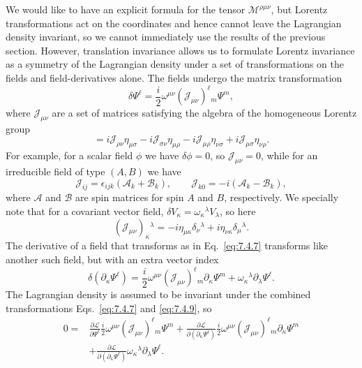 We would like to have an explicit formula for the tensor
$\mathcal{M}^{\rho\mu\nu}$, but Lorentz transformations act on the coordinates
and hence cannot leave the Lagrangian density invariant, so we cannot
immediately use the results of the previous section. However, translation
invariance allows us to formulate Lorentz invariance as a symmetry of the
Lagrangian density under a set of transformations on the fields and
field-derivatives alone. The fields undergo the matrix transformation
\begin{equation}
\delta\Psi^\ell=\frac{i}{2}\omega^{\mu\nu}
(\mathcal{J}_{\mu\nu})^\ell{}_m\Psi^m,
\tag{7.4.7}\label{eq:7.4.7}
\end{equation}
where $\mathcal{J}_{\mu\nu}$ are a set of matrices satisfying the algebra of the
homogeneous Lorentz group
\begin{equation}
[\mathcal{J}_{\mu\nu},\mathcal{J}_{\rho\sigma}]
=i\mathcal{J}_{\rho\nu}\eta_{\mu\sigma}
-i\mathcal{J}_{\sigma\nu}\eta_{\mu\rho}
-i\mathcal{J}_{\mu\rho}\eta_{\nu\sigma}
+i\mathcal{J}_{\mu\sigma}\eta_{\nu\rho}.
\tag{7.4.8}\label{eq:7.4.8}
\end{equation}
For example, for a scalar field $\phi$ we have $\delta\phi=0$, so
$\mathcal{J}_{\mu\nu}=0$, while for an irreducible field of type $(A,B)$ we have
\[
\mathcal{J}_{ij}=\epsilon_{ijk}(\mathcal{A}_k+\mathcal{B}_k),
\qquad
\mathcal{J}_{k0}=-i(\mathcal{A}_k-\mathcal{B}_k),
\]
where $\mathcal{A}$ and $\mathcal{B}$ are spin matrices for spin $A$ and $B$,
respectively. We specially note that for a covariant vector field,
$\delta V_\kappa=\omega_\kappa{}^\lambda V_\lambda$, so here
\[
(\mathcal{J}_{\mu\nu})_\kappa{}^\lambda
=-i\eta_{\mu\kappa}\delta_\nu{}^\lambda
+i\eta_{\nu\kappa}\delta_\mu{}^\lambda.
\]
The derivative of a field that transforms as in Eq.~\eqref{eq:7.4.7} transforms like
another such field, but with an extra vector index
\begin{equation}
\delta(\partial_\kappa\Psi^\ell)
=\frac{i}{2}\omega^{\mu\nu}(\mathcal{J}_{\mu\nu})^\ell{}_m
\partial_\kappa\Psi^m
+\omega_\kappa{}^\lambda\partial_\lambda\Psi^\ell.
\tag{7.4.9}\label{eq:7.4.9}
\end{equation}
The Lagrangian density is assumed to be invariant under the combined
transformations Eqs.~\eqref{eq:7.4.7} and \eqref{eq:7.4.9}, so
\begin{align*}
0={}&\frac{\partial\mathcal{L}}{\partial\Psi^\ell}
\frac{i}{2}\omega^{\mu\nu}(\mathcal{J}_{\mu\nu})^\ell{}_m\Psi^m
+\frac{\partial\mathcal{L}}{\partial(\partial_\kappa\Psi^\ell)}
\frac{i}{2}\omega^{\mu\nu}(\mathcal{J}_{\mu\nu})^\ell{}_m
\partial_\kappa\Psi^m\\
&+\frac{\partial\mathcal{L}}{\partial(\partial_\kappa\Psi^\ell)}
\omega_\kappa{}^\lambda\partial_\lambda\Psi^\ell.
\end{align*}
